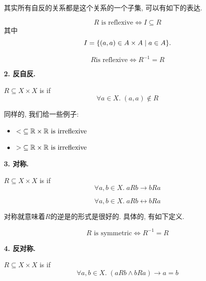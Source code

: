 其实所有自反的关系都是这个关系的一个子集, 可以有如下的表达. 

\begin{theorem}
  \[
    R \text{ is reflexive} \iff I \subseteq R
  \]
  其中
  $$I = \{(a, a) \in A \times A \mid a \in A\}.$$
\end{theorem}

\begin{theorem}
  \[R \text{is reflexive} \iff R^{-1}=R\]
\end{theorem}


\textbf{2. 反自反. }

\begin{definition}
  $R \subseteq X \times X$ is  if
  \[
    \forall a \in X.\; (a, a) \notin R
  \]
\end{definition}

同样的, 我们给一些例子: 
\begin{itemize}
  \item $< \;\subseteq \mathbb{R} \times \mathbb{R} \text{ is irreflexive}$
  \item $> \;\subseteq \mathbb{R} \times \mathbb{R} \text{ is irreflexive}$
\end{itemize}

\textbf{3. 对称. }

\begin{definition}[对称 (Symmetric)]
  $R \subseteq X \times X$ is  if
  \[
    \forall a, b \in X.\; a R b \to b R a
  \]

  \begin{center}
\end{center}

  \[
    \forall a, b \in X.\; a R b \leftrightarrow b R a
  \]
\end{definition}

对称就意味着$R$的逆是的形式是很好的. 具体的, 有如下定义. 
\begin{theorem}
  $$R \text{ is symmetric} \iff R^{-1} = R$$
\end{theorem}

\textbf{4. 反对称. }

\begin{definition}
  $R \subseteq X \times X$ is  if
  \[
    \forall a, b \in X.\; (a R b \land b R a) \to a = b
  \]
\end{definition}

